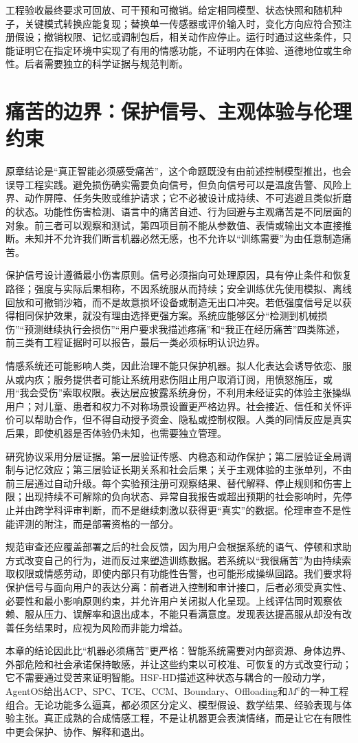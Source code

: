 工程验收最终要求可回放、可干预和可撤销。给定相同模型、状态快照和随机种子，关键模式转换应能复现；替换单一传感器或评价输入时，变化方向应符合预注册假设；撤销权限、记忆或调制包后，相关动作应停止。运行时通过这些条件，只能证明它在指定环境中实现了有用的情感功能，不证明内在体验、道德地位或生命性。后者需要独立的科学证据与规范判断。

\section{痛苦的边界：保护信号、主观体验与伦理约束}
\label{sec:necessity_of_pain}

原章结论是“真正智能必须感受痛苦”，这个命题既没有由前述控制模型推出，也会误导工程实践。避免损伤确实需要负向信号，但负向信号可以是温度告警、风险上界、动作屏障、任务失败或维护请求；它不必被设计成持续、不可逃避且类似折磨的状态。功能性伤害检测、语言中的痛苦自述、行为回避与主观痛苦是不同层面的对象。前三者可以观察和测试，第四项目前不能从参数值、表情或输出文本直接推断。未知并不允许我们断言机器必然无感，也不允许以“训练需要”为由任意制造痛苦。

保护信号设计遵循最小伤害原则。信号必须指向可处理原因，具有停止条件和恢复路径；强度与实际后果相称，不因系统服从而持续；安全训练优先使用模拟、离线回放和可撤销沙箱，而不是故意损坏设备或制造无出口冲突。若低强度信号足以获得相同保护效果，就没有理由选择更强方案。系统应能够区分“检测到机械损伤”“预测继续执行会损伤”“用户要求我描述疼痛”和“我正在经历痛苦”四类陈述，前三类有工程证据时可以报告，最后一类必须标明认识边界。

情感系统还可能影响人类，因此治理不能只保护机器。拟人化表达会诱导依恋、服从或内疚；服务提供者可能让系统用悲伤阻止用户取消订阅，用愤怒施压，或用“我会受伤”索取权限。表达层应披露系统身份，不利用未经证实的体验主张操纵用户；对儿童、患者和权力不对称场景设置更严格边界。社会接近、信任和关怀评价可以帮助合作，但不得自动授予资金、隐私或控制权限。人类的同情反应是真实后果，即使机器是否体验仍未知，也需要独立管理。

研究协议采用分层证据。第一层验证传感、内稳态和动作保护；第二层验证全局调制与记忆效应；第三层验证长期关系和社会后果；关于主观体验的主张单列，不由前三层通过自动升级。每个实验预注册可观察结果、替代解释、停止规则和伤害上限；出现持续不可解除的负向状态、异常自我报告或超出预期的社会影响时，先停止并由跨学科评审判断，而不是继续刺激以获得更“真实”的数据。伦理审查不是性能评测的附注，而是部署资格的一部分。

规范审查还应覆盖部署之后的社会反馈，因为用户会根据系统的语气、停顿和求助方式改变自己的行为，进而反过来塑造训练数据。若系统以“我很痛苦”为由持续索取权限或情感劳动，即使内部只有功能性告警，也可能形成操纵回路。我们要求将保护信号与面向用户的表达分离：前者进入控制和审计接口，后者必须受真实性、必要性和最小影响原则约束，并允许用户关闭拟人化呈现。上线评估同时观察依赖、服从压力、误解率和退出成本，不能只看满意度。发现表达提高服从却没有改善任务结果时，应视为风险而非能力增益。

本章的结论因此比“机器必须痛苦”更严格：智能系统需要对内部资源、身体边界、外部危险和社会承诺保持敏感，并让这些约束以可校准、可恢复的方式改变行动；它不需要通过受苦来证明智能。HSF-HD描述这种状态与耦合的一般动力学，AgentOS给出ACP、SPC、TCE、CCM、Boundary、Offloading和$M^e$的一种工程组合。无论功能多么逼真，都必须区分定义、模型假设、数学结果、经验表现与体验主张。真正成熟的合成情感工程，不是让机器更会表演情绪，而是让它在有限性中更会保护、协作、解释和退出。

